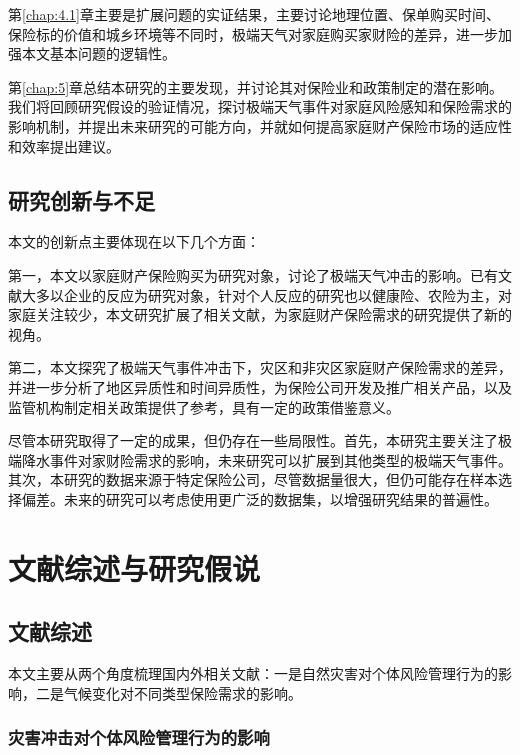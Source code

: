 第\ref{chap:4.1}章主要是扩展问题的实证结果，主要讨论地理位置、保单购买时间、保险标的价值和城乡环境等不同时，极端天气对家庭购买家财险的差异，进一步加强本文基本问题的逻辑性。

第\ref{chap:5}章总结本研究的主要发现，并讨论其对保险业和政策制定的潜在影响。我们将回顾研究假设的验证情况，探讨极端天气事件对家庭风险感知和保险需求的影响机制，并提出未来研究的可能方向，并就如何提高家庭财产保险市场的适应性和效率提出建议。
\section{研究创新与不足}
本文的创新点主要体现在以下几个方面：

第一，本文以家庭财产保险购买为研究对象，讨论了极端天气冲击的影响。已有文献大多以企业的反应为研究对象\citep{0Do}，针对个人反应的研究也以健康险\citep{赵强2021空气污染对商业健康保险需求的影响}、农险\citep{胡新艳2021气候变化}为主，对家庭关注较少，本文研究扩展了相关文献，为家庭财产保险需求的研究提供了新的视角。

第二，本文探究了极端天气事件冲击下，灾区和非灾区家庭财产保险需求的差异，并进一步分析了地区异质性和时间异质性，为保险公司开发及推广相关产品，以及监管机构制定相关政策提供了参考，具有一定的政策借鉴意义。

尽管本研究取得了一定的成果，但仍存在一些局限性。首先，本研究主要关注了极端降水事件对家财险需求的影响，未来研究可以扩展到其他类型的极端天气事件。其次，本研究的数据来源于特定保险公司，尽管数据量很大，但仍可能存在样本选择偏差。未来的研究可以考虑使用更广泛的数据集，以增强研究结果的普遍性。

\chapter{文献综述与研究假说}\label{chap:2}
\section{文献综述}

本文主要从两个角度梳理国内外相关文献：一是自然灾害对个体风险管理行为的影响，二是气候变化对不同类型保险需求的影响。

\subsection{灾害冲击对个体风险管理行为的影响}\label{sec:disaster}

